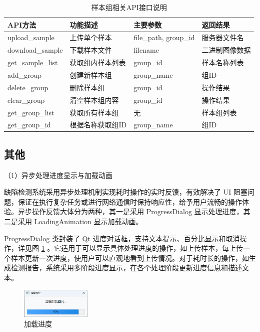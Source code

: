 \documentclass[
  ]{njuthesis}
\begin{document}
\begin{table}[H]
    \centering
    \caption{样本组相关API接口说明}
    \label{sample_API}
    \renewcommand\arraystretch{0.5}
    \begin{tabular}{p{2.5cm}p{3.5cm}p{4cm}p{2.5cm}}
    \toprule[1.5pt]
    API方法 & 功能描述 & 主要参数 & 返回结果 \\
    \midrule[1pt]
    upload\_sample & 上传单个样本 & file\_path, group\_id & 服务器文件名 \\
    \midrule[0.5pt]
    download\_sample & 下载样本文件 & filename & 二进制图像数据 \\
    \midrule[0.5pt]
    get\_sample\_list & 获取组内样本列表 & group\_id & 样本名称列表 \\
    \midrule[0.5pt]
    add\_group & 创建新样本组 & group\_name & 组ID \\
    \midrule[0.5pt]
    delete\_group & 删除样本组 & group\_id & 操作结果 \\
    \midrule[0.5pt]
    clear\_group & 清空样本组内容 & group\_id & 操作结果 \\
    \midrule[0.5pt]
    get\_group\_list & 获取所有样本组 & 无 & 样本组列表 \\
    \midrule[0.5pt]
    get\_group\_id & 根据名称获取组ID & group\_name & 组ID \\
    \bottomrule[1.5pt]
    \end{tabular}
\end{table}


\subsection{其他}

（1）异步处理进度显示与加载动画

缺陷检测系统采用异步处理机制实现耗时操作的实时反馈，有效解决了 UI 阻塞问题，保证在执行复杂任务或进行网络通信时保持响应性，给予用户流畅的操作体验。异步操作反馈大体分为两种，其一是采用 ProgressDialog 显示处理进度，其二是采用 LoadingAnimation 显示加载动画。

ProgressDialog 类封装了 Qt 进度对话框，支持文本提示、百分比显示和取消操作，详见图 \ref{加载进度} 。它适用于可以显示具体处理进度的操作，如上传样本，每上传一个样本更新一次进度，使用户可以直观地看到上传情况。对于耗时长的操作，如生成检测报告，系统采用多阶段进度显示，在各个处理阶段更新进度信息和描述文本。

\begin{figure}[htb]
    \centering
    \includegraphics[width=0.3\textwidth]{images/加载进度.png}
    \caption{加载进度}
    \label{加载进度}
\end{figure}
\end{document}
